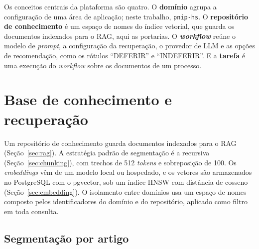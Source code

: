 \begin{figure}[htb]
{}
\end{figure}

Os conceitos centrais da plataforma são quatro. O \textbf{domínio} agrupa a configuração de uma área de aplicação; neste trabalho, \texttt{pnip-hs}. O \textbf{repositório de conhecimento} é um espaço de nomes do índice vetorial, que guarda os documentos indexados para o RAG, aqui as portarias. O \textbf{\textit{workflow}} reúne o modelo de \textit{prompt}, a configuração da recuperação, o provedor de LLM e as opções de recomendação, como os rótulos ``DEFERIR'' e ``INDEFERIR''. E a \textbf{tarefa} é uma execução do \textit{workflow} sobre os documentos de um processo.

\section{Base de conhecimento e recuperação}
\label{sec:base-conhecimento}

Um repositório de conhecimento guarda documentos indexados para o RAG (Seção~\ref{sec:rag}). A estratégia padrão de segmentação é a recursiva (Seção~\ref{sec:chunking}), com trechos de 512 \textit{tokens} e sobreposição de 100. Os \textit{embeddings} vêm de um modelo local ou hospedado, e os vetores são armazenados no PostgreSQL com o pgvector, sob um índice HNSW com distância de cosseno (Seção~\ref{sec:embedding}). O isolamento entre domínios usa um espaço de nomes composto pelos identificadores do domínio e do repositório, aplicado como filtro em toda consulta.

\subsection{Segmentação por artigo}

